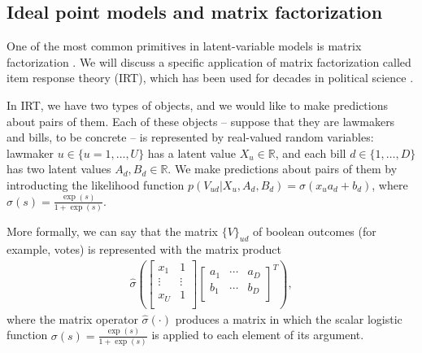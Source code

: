 
\subsection{Ideal point models and matrix factorization}

One of the most common primitives in latent-variable models is matrix
factorization \cite{salakhutdinov:2008a}. We will discuss a specific
application of matrix factorization called item response theory (IRT),
which has been used for decades in political science
\cite{clinton:2004,martin:2002,poole:1991,enelow:1984,albert:1992}.

In IRT, we have two types of objects, and we would like to make
predictions about pairs of them.  Each of these objects -- suppose
that they are lawmakers and bills, to be concrete -- is represented by
real-valued random variables: lawmaker $u \in \{ u=1, \ldots, U \}$
has a latent value $X_u \in \mathbb{R}$, and each bill $d \in \{ 1,
\ldots, D \}$ has two latent values $A_d,B_d \in \mathbb{R}$.  We make
predictions about pairs of them by introducting the likelihood
function $p(V_{ud} | X_u, A_d, B_d) = \sigma( x_u a_d + b_d )$, where
$\sigma(s) = \frac{\exp(s)}{ 1 + \exp(s) }$.

More formally, we can say that the matrix $\{V\}_{ud}$ of boolean outcomes (for example, votes) is represented with the matrix product
\begin{align}
  \hat \sigma \left( \left[ \begin{array}{cc}
    x_1 & 1 \\
    \vdots & \vdots \\
    x_U & 1 \\
  \end{array}
  \right]
  \left[
    \begin{array}{ccc}
      a_1 & \cdots & a_D \\
      b_1 & \cdots & b_D \\
    \end{array}
    \right]^T 
  \right),
\end{align}
where the matrix operator $\hat \sigma(\cdot)$ produces a matrix in
which the scalar logistic function $\sigma(s) = \frac{\exp(s)}{1 +
  \exp(s)}$ is applied to each element of its argument.

